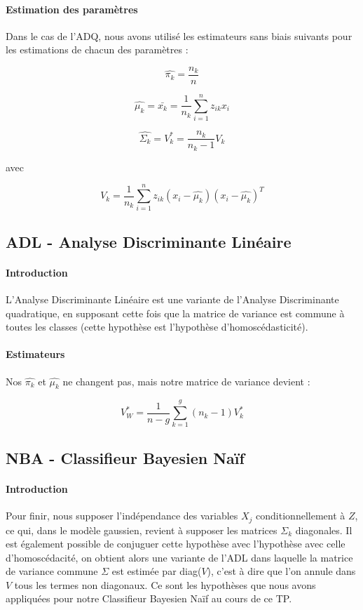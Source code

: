 \documentclass{report}
\begin{document}
\paragraph{Estimation des paramètres}
Dans le cas de l'ADQ, nous avons utilisé les estimateurs sans biais suivants pour les estimations de chacun des paramètres :

$$ \hat{\pi_k} = \frac{n_k}{n}$$

$$ \hat{\mu_k} = \bar{x_k} = \frac{1}{n_k}\sum_{i=1}^n z_{ik}x_i $$

$$ \hat{\Sigma_k} = V_k^* = \frac{n_k}{n_k - 1} V_k$$

avec

$$ V_k = \frac{1}{n_k}\sum_{i=1}^n z_{ik}(x_i - \hat{\mu_k})(x_i - \hat{\mu_k})^T$$

\subsection{ADL - Analyse Discriminante Linéaire}
\paragraph{Introduction}
L'Analyse Discriminante Linéaire est une variante de l'Analyse Discriminante quadratique, en supposant cette fois que la matrice de variance est commune à toutes les classes (cette hypothèse est l'hypothèse d'homoscédasticité).

\paragraph{Estimateurs}
Nos $\hat{\pi_k}$ et $\hat{\mu_k}$ ne changent pas, mais notre matrice de variance devient :


$$ V_W^* = \frac{1}{n-g} \sum_{k=1}^g (n_k-1)V_k^*$$

\subsection{NBA - Classifieur Bayesien Naïf}
\paragraph{Introduction}
Pour finir, nous supposer l'indépendance des variables $X_j$ conditionnellement à $Z$, ce qui, dans le modèle gaussien, revient à supposer les matrices $\Sigma_k$ diagonales. Il est également possible de conjuguer cette hypothèse avec l'hypothèse avec celle d'homoscédacité, on obtient alors une variante de l'ADL dans laquelle la matrice de variance commune $\Sigma$ est estimée par diag($V$), c'est à dire que l'on annule dans $V$ tous les termes non diagonaux. Ce sont les hypothèses que nous avons appliquées pour notre Classifieur Bayesien Naïf au cours de ce TP.
\end{document}

